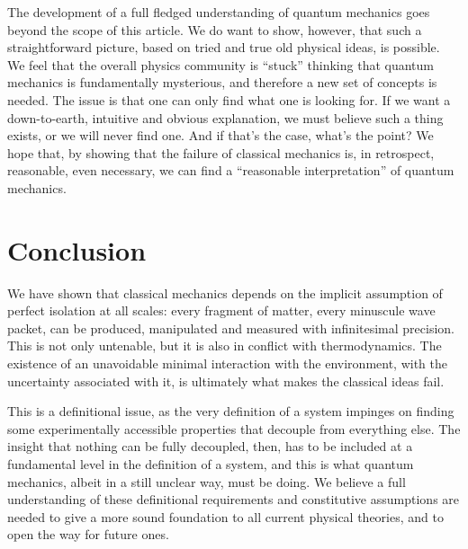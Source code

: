 \documentclass[10pt,twocolumn, nofootinbib]{revtex4-2}
\begin{document}
The development of a full fledged understanding of quantum mechanics goes beyond the scope of this article. We do want to show, however, that such a straightforward picture, based on tried and true old physical ideas, is possible. We feel that the overall physics community is ``stuck'' thinking that quantum mechanics is fundamentally mysterious, and therefore a new set of concepts is needed. The issue is that one can only find what one is looking for. If we want a down-to-earth, intuitive and obvious explanation, we must believe such a thing exists, or we will never find one. And if that's the case, what's the point?  We hope that, by showing that the failure of classical mechanics is, in retrospect, reasonable, even necessary, we can find a ``reasonable interpretation'' of quantum mechanics.

\section{Conclusion}

We have shown that classical mechanics depends on the implicit assumption of perfect isolation at all scales: every fragment of matter, every minuscule wave packet, can be produced, manipulated and measured with infinitesimal precision. This is not only untenable, but it is also in conflict with thermodynamics. The existence of an unavoidable minimal interaction with the environment, with the uncertainty associated with it, is ultimately what makes the classical ideas fail.

This is a definitional issue, as the very definition of a system impinges on finding some experimentally accessible properties that decouple from everything else. The insight that nothing can be fully decoupled, then, has to be included at a fundamental level in the definition of a system, and this is what quantum mechanics, albeit in a still unclear way, must be doing. We believe a full understanding of these definitional requirements and constitutive assumptions are needed to give a more sound foundation to all current physical theories, and to open the way for future ones.




\end{document}

